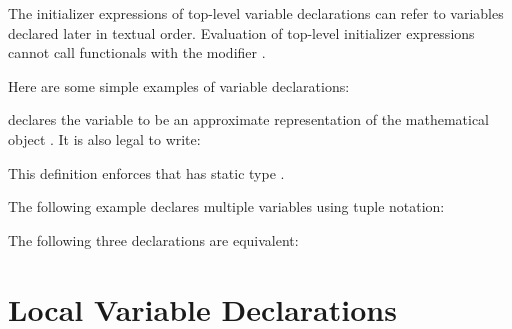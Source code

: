 The initializer expressions of top-level variable declarations can refer to
variables declared later in textual order.
\label{decl-io}
Evaluation of top-level initializer expressions cannot call
functionals with the modifier .


Here are some simple examples of variable declarations:

declares the variable \EXP{\pi}
to be an approximate representation of the mathematical object \EXP{\pi}.
It is also legal to write:

This definition enforces that \EXP{\pi} has static type .

The following example declares multiple variables using tuple notation:


The following three declarations are equivalent:

\vspace*{-1em}

\vspace*{-1.4em}



\section{Local Variable Declarations}


